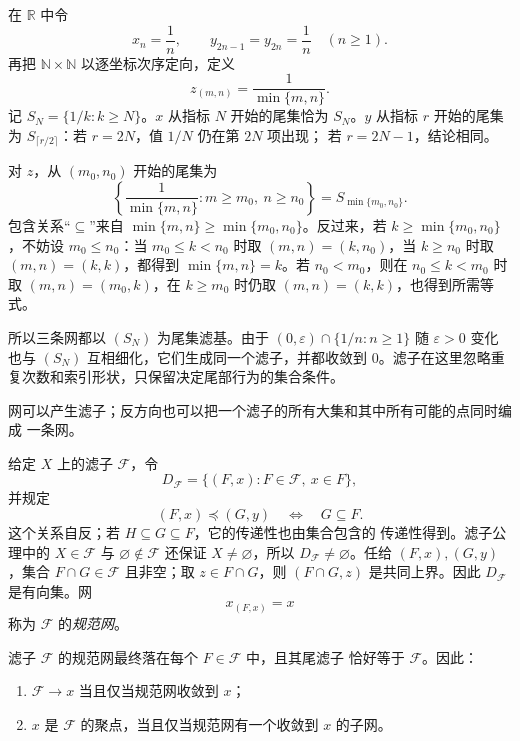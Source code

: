 \begin{example}[不同指标方式可以产生同一尾滤子]
在 \(\mathbb R\) 中令
\[
 x_n=\frac1n,
 \qquad
 y_{2n-1}=y_{2n}=\frac1n
 \quad(n\geq1).
\]
再把 \(\mathbb N\times\mathbb N\) 以逐坐标次序定向，定义
\[
 z_{(m,n)}=\frac1{\min\{m,n\}}.
\]
记 \(S_N=\{1/k:k\geq N\}\)。\(x\) 从指标 \(N\) 开始的尾集恰为
\(S_N\)。\(y\) 从指标 \(r\) 开始的尾集为
\(S_{\lceil r/2\rceil}\)：若 \(r=2N\)，值 \(1/N\) 仍在第 \(2N\) 项出现；
若 \(r=2N-1\)，结论相同。

对 \(z\)，从 \((m_0,n_0)\) 开始的尾集为
\[
 \left\{\frac1{\min\{m,n\}}:m\geq m_0,\ n\geq n_0\right\}
 =S_{\min\{m_0,n_0\}}.
\]
包含关系“\(\subseteq\)”来自
\(\min\{m,n\}\geq\min\{m_0,n_0\}\)。反过来，若
\(k\geq\min\{m_0,n_0\}\)，不妨设 \(m_0\leq n_0\)：当
\(m_0\leq k<n_0\) 时取 \((m,n)=(k,n_0)\)，当 \(k\geq n_0\) 时取
\((m,n)=(k,k)\)，都得到 \(\min\{m,n\}=k\)。若 \(n_0<m_0\)，则在
\(n_0\leq k<m_0\) 时取 \((m,n)=(m_0,k)\)，在 \(k\geq m_0\) 时仍取
\((m,n)=(k,k)\)，也得到所需等式。

所以三条网都以 \((S_N)\) 为尾集滤基。由于
\((0,\varepsilon)\cap\{1/n:n\geq1\}\) 随 \(\varepsilon>0\) 变化也与
\((S_N)\) 互相细化，它们生成同一个滤子，并都收敛到 \(0\)。滤子在这里忽略重复次数和索引形状，只保留决定尾部行为的集合条件。
\end{example}

网可以产生滤子；反方向也可以把一个滤子的所有大集和其中所有可能的点同时编成
一条网。

\begin{definition}[滤子产生的规范网]
给定 \(X\) 上的滤子 \(\mathcal F\)，令
\[
 D_{\mathcal F}=\{(F,x):F\in\mathcal F,\ x\in F\},
\]
并规定
\[
 (F,x)\preceq(G,y)\quad\Longleftrightarrow\quad G\subseteq F.
\]
这个关系自反；若 \(H\subseteq G\subseteq F\)，它的传递性也由集合包含的
传递性得到。滤子公理中的 \(X\in\mathcal F\) 与
\(\varnothing\notin\mathcal F\) 还保证 \(X\neq\varnothing\)，所以
\(D_{\mathcal F}\neq\varnothing\)。任给 \((F,x),(G,y)\)，集合
\(F\cap G\in\mathcal F\) 且非空；取 \(z\in F\cap G\)，则
\((F\cap G,z)\) 是共同上界。因此 \(D_{\mathcal F}\) 是有向集。网
\[
 x_{(F,x)}=x
\]
称为 \(\mathcal F\) 的\emph{规范网}。
\end{definition}

\begin{theorem}[网--滤子词典]
滤子 \(\mathcal F\) 的规范网最终落在每个 \(F\in\mathcal F\) 中，且其尾滤子
恰好等于 \(\mathcal F\)。因此：
\begin{enumerate}
  \item \(\mathcal F\to x\) 当且仅当规范网收敛到 \(x\)；
  \item \(x\) 是 \(\mathcal F\) 的聚点，当且仅当规范网有一个收敛到 \(x\)
        的子网。
\end{enumerate}
\label{ch1:thm:net-filter-dictionary}
\end{theorem}

